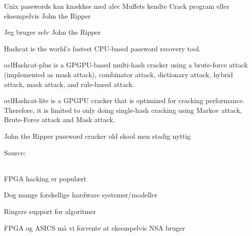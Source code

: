 \documentclass[20pt,landscape,a4paper,footrule]{foils}
\begin{document}
\begin{list1}
\item Unix passwords kan knækkes med alec Muffets kendte Crack program
  eller eksempelvis John the Ripper 
\item Jeg bruger selv John the Ripper
\end{list1}


\begin{list2}
\item Hashcat is the world's fastest CPU-based password recovery tool.
\item oclHashcat-plus is a GPGPU-based multi-hash cracker using a brute-force attack (implemented as mask attack), combinator attack, dictionary attack, hybrid attack, mask attack, and rule-based attack.
\item oclHashcat-lite is a GPGPU cracker that is optimized for cracking performance. Therefore, it is limited to only doing single-hash cracking using Markov attack, Brute-Force attack and Mask attack.
\item John the Ripper password cracker old skool men stadig nyttig
\end{list2}

Source:\\
\\




\begin{list1}
\item FPGA hacking er populært
\item Dog mange forskellige hardware systemer/modeller
\item Ringere support for algoritmer
\end{list1}



FPGA og ASICS må vi forvente at eksempelvis NSA bruger\\
{\footnotesize
{}\\ }


\end{document}
